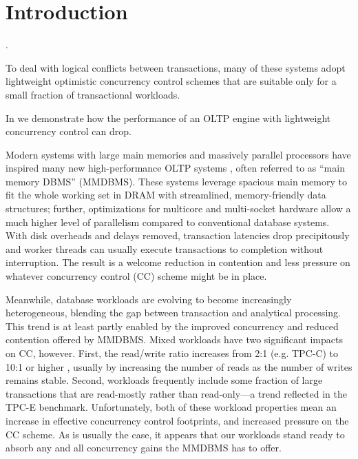 
\section{Introduction}

 \cite{Corbett+12,BailisFHGS14,ThomsonA10}. 

To deal with logical conflicts between transactions, many of these systems adopt lightweight optimistic concurrency control schemes that are suitable only for a small fraction of transactional workloads.



In  we demonstrate how the performance of an OLTP engine with lightweight concurrency control can drop.

Modern systems with large main memories and massively parallel processors have inspired many new high-performance OLTP systems \cite{Kallman+08,KemperN11,LarsonBDFPZ11,TuZKLM13}, often referred to as ``main memory DBMS'' (MMDBMS). These systems leverage spacious main memory to fit the whole working set in DRAM with streamlined, memory-friendly data structures; further, optimizations for multicore and multi-socket hardware allow a much higher level of parallelism compared to conventional database systems. With disk overheads and delays removed, transaction latencies drop precipitously and worker threads can usually execute transactions to completion without interruption. The result is a welcome reduction in contention and less pressure on whatever concurrency control (CC) scheme might be in place.

Meanwhile, database workloads are evolving to become increasingly heterogeneous, blending the gap between transaction and analytical processing. This trend is at least partly enabled by the improved concurrency and reduced contention offered by MMDBMS. Mixed workloads have two significant impacts on CC, however. First, the read/write ratio increases from 2:1 (e.g. TPC-C) to 10:1 or higher \cite{Chen+10,TozunPKJA13}, usually by increasing the number of reads as the number of writes remains stable. Second, workloads frequently include some fraction of large transactions that are read-mostly rather than read-only---a trend reflected in the TPC-E \cite{TPCE} benchmark. Unfortunately, both of these workload properties mean an increase in effective concurrency control footprints, and increased pressure on the CC scheme. As is usually the case, it appears that our workloads stand ready to absorb any and all concurrency gains the MMDBMS has to offer.

